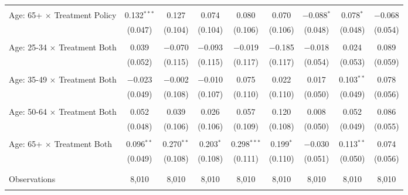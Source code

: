 \begin{tabular}{@{\extracolsep{5pt}}lcccccccc}
  & & & & & & & & \\ 
 Age: 65+ $\times$ Treatment Policy & 0.132$^{***}$ & 0.127 & 0.074 & 0.080 & 0.070 & $-$0.088$^{*}$ & 0.078$^{*}$ & $-$0.068 \\ 
  & (0.047) & (0.104) & (0.104) & (0.106) & (0.106) & (0.048) & (0.048) & (0.054) \\ 
  & & & & & & & & \\ 
 Age: 25-34 $\times$ Treatment Both & 0.039 & $-$0.070 & $-$0.093 & $-$0.019 & $-$0.185 & $-$0.018 & 0.024 & 0.089 \\ 
  & (0.052) & (0.115) & (0.115) & (0.117) & (0.117) & (0.054) & (0.053) & (0.059) \\ 
  & & & & & & & & \\ 
 Age: 35-49 $\times$ Treatment Both & $-$0.023 & $-$0.002 & $-$0.010 & 0.075 & 0.022 & 0.017 & 0.103$^{**}$ & 0.078 \\ 
  & (0.049) & (0.108) & (0.107) & (0.110) & (0.110) & (0.050) & (0.049) & (0.056) \\ 
  & & & & & & & & \\ 
 Age: 50-64 $\times$ Treatment Both & 0.052 & 0.039 & 0.026 & 0.057 & 0.120 & 0.008 & 0.052 & 0.086 \\ 
  & (0.048) & (0.106) & (0.106) & (0.109) & (0.108) & (0.050) & (0.049) & (0.055) \\ 
  & & & & & & & & \\ 
 Age: 65+ $\times$ Treatment Both & 0.096$^{**}$ & 0.270$^{**}$ & 0.203$^{*}$ & 0.298$^{***}$ & 0.199$^{*}$ & $-$0.030 & 0.113$^{**}$ & 0.074 \\ 
  & (0.049) & (0.108) & (0.108) & (0.111) & (0.110) & (0.051) & (0.050) & (0.056) \\ 
  & & & & & & & & \\ 
\hline \\[-1.8ex] 

Observations & 8,010 & 8,010 & 8,010 & 8,010 & 8,010 & 8,010 & 8,010 & 8,010 \\ 
\hline 
\hline \\[-1.8ex] 
\end{tabular} 